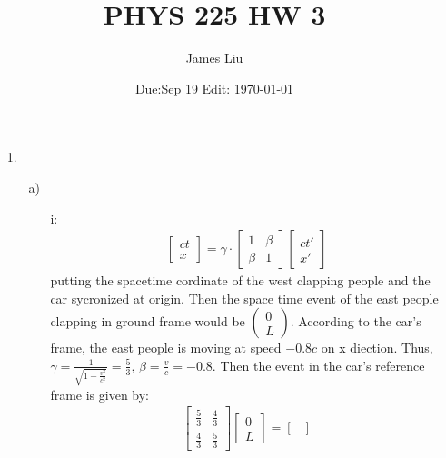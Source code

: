 \documentclass{article}
\date{Due:Sep 19 Edit: \today}
\title{PHYS 225 HW 3}
\author{James Liu}
\begin{document}
\maketitle
\begin{itemize}
    \item [1.]
    \begin{itemize}
        \item [a)]
        \begin{itemize}
            \item [i:]
            \begin{align*}
                \begin{bmatrix}
                    ct\\
                    x
                \end{bmatrix}
                =\gamma\cdot\begin{bmatrix}
                     1&\beta\\\beta & 1
                \end{bmatrix}\begin{bmatrix}
                    ct'\\ x'
                \end{bmatrix}
            \end{align*}
            putting the spacetime cordinate of the west clapping people and the car sycronized at origin.
            Then the space time event of the east people clapping in ground frame would be \(\displaystyle \begin{pmatrix}
               0\\L 
            \end{pmatrix}\). According to the car's frame, the east people is moving at speed \(-0.8 c\) on x diection.
            Thus, \(\gamma = \frac{1}{\sqrt{1-\frac{v^2}{c^2}}} = \frac{5}{3}\), \(\beta = \frac{v}{c}=-0.8\).
            Then the event in the car's reference frame is given by:
            \begin{align*}
                \begin{bmatrix}
                    \frac{5}{3}&\frac{4}{3}\\
                    \frac{4}{3}&\frac{5}{3}
                \end{bmatrix}
                \begin{bmatrix}
                    0\\L
                \end{bmatrix}=
                \begin{bmatrix}

\end{bmatrix}
\end{align*}
\end{itemize}
\end{itemize}
\end{itemize}
\end{document}
